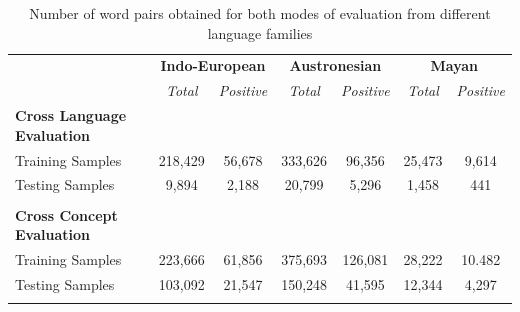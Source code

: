 \documentclass[11pt,letterpaper]{article}
\begin{document}
\begin{table}[t]
\centering
\begin{tabular}{|l|cc|cc|cc|}
\cline{2-7}
\multicolumn{1}{c}{\textbf{}} & \multicolumn{2}{|c|}{\textbf{Indo-European}} & \multicolumn{2}{c|}{\textbf{Austronesian}} & \multicolumn{2}{c|}{\textbf{Mayan}} \\ \cline{2-7}
\multicolumn{1}{c|}{}          & \textit{Total}               & \textit{Positive}             & \textit{Total}               & \textit{Positive}            & \textit{Total}           & \textit{Positive}         \\ \hline
\textbf{Cross Language Evaluation}                      &                      &                      &                 &                &             &             \\
Training Samples              & 218,429             & 56,678               & 333,626             & 96,356              & 25,473          & 9,614            \\
Testing Samples               & 9,894               & 2,188                & 20,799              & 5,296               & 1,458           & 441             \\
                                                       &                      &                      &                 &                &             &             \\ \hline
\textbf{Cross Concept Evaluation}                      &                      &                      &                 &                &             &             \\
Training Samples              & 223,666             & 61,856               & 375,693             & 126,081             & 28,222          & 10.482           \\
Testing Samples               & 103,092             & 21,547               & 150,248             & 41,595              & 12,344          & 4,297                       \\ 
                                                       &                      &                      &                 &                &             &             \\ \hline
\end{tabular}
\caption{Number of word pairs obtained for both modes of evaluation from different language families}
\label{C_count}
\end{table}

\end{document}
